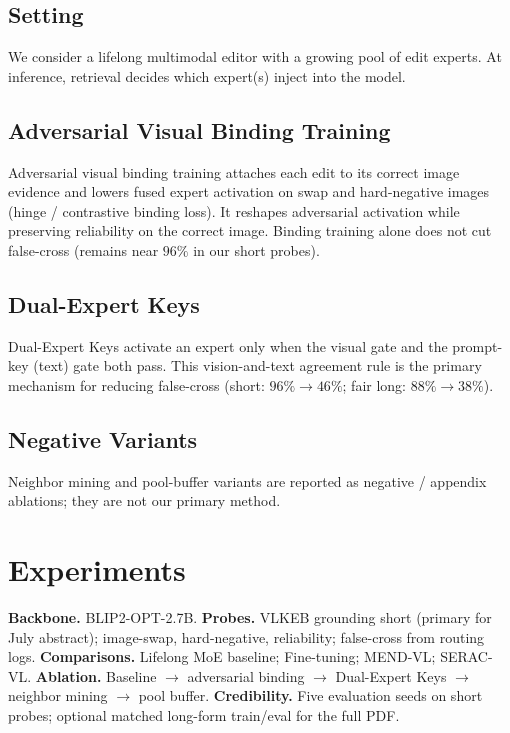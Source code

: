 \documentclass[letterpaper]{article} %
\begin{document}
\subsection{Setting}
We consider a lifelong multimodal editor with a growing pool of edit experts.
At inference, retrieval decides which expert(s) inject into the model.

\subsection{Adversarial Visual Binding Training}
Adversarial visual binding training attaches each edit to its correct image evidence and lowers fused expert activation on swap and hard-negative images (hinge / contrastive binding loss).
It reshapes adversarial activation while preserving reliability on the correct image.
Binding training alone does not cut false-cross (remains near $96\%$ in our short probes).

\subsection{Dual-Expert Keys}
Dual-Expert Keys activate an expert only when the visual gate and the prompt-key (text) gate both pass.
This vision-and-text agreement rule is the primary mechanism for reducing false-cross (short: $96\%\!\rightarrow\!46\%$; fair long: $88\%\!\rightarrow\!38\%$).

\subsection{Negative Variants}
Neighbor mining and pool-buffer variants are reported as negative / appendix ablations; they are not our primary method.

\section{Experiments}
\label{sec:experiments}

\textbf{Backbone.} BLIP2-OPT-2.7B.
\textbf{Probes.} VLKEB grounding short (primary for July abstract); image-swap, hard-negative, reliability; false-cross from routing logs.
\textbf{Comparisons.} Lifelong MoE baseline; Fine-tuning; MEND-VL; SERAC-VL.
\textbf{Ablation.} Baseline $\rightarrow$ adversarial binding $\rightarrow$ Dual-Expert Keys $\rightarrow$ neighbor mining $\rightarrow$ pool buffer.
\textbf{Credibility.} Five evaluation seeds on short probes; optional matched long-form train/eval for the full PDF.
\end{document}
